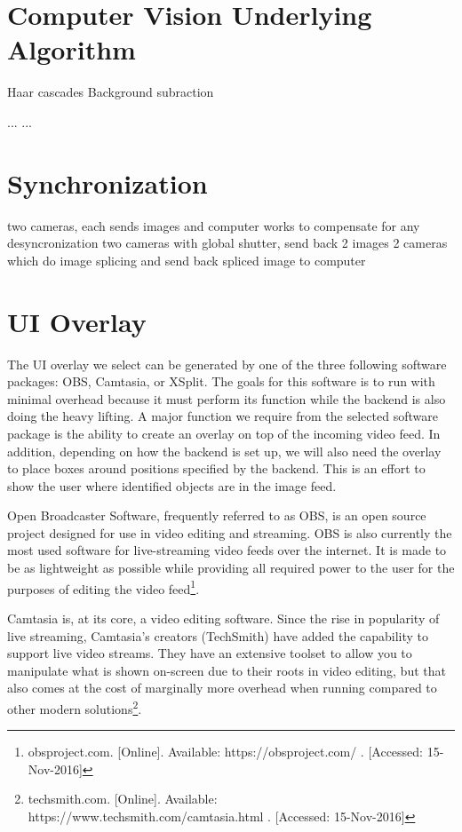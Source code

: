 \documentclass[letterpaper,10pt,onecolumn,draftclsnofoot]{IEEEtran}
\begin{document}
\section{Computer Vision Underlying Algorithm} %

Haar cascades
Background subraction

...
...

\section{Synchronization} %

two cameras, each sends images and computer works to compensate for any desyncronization
two cameras with global shutter, send back 2 images
2 cameras which do image splicing and send back spliced image to computer

\section{UI Overlay} %

The UI overlay we select can be generated by one of the three following software packages:  OBS, Camtasia, or XSplit.  The goals for this software is to run with minimal overhead because it must perform its function while the backend is also doing the heavy lifting.  A major function we require from the selected software package is the ability to create an overlay on top of the incoming video feed.  In addition, depending on how the backend is set up, we will also need the overlay to place boxes around positions specified by the backend.  This is an effort to show the user where identified objects are in the image feed.

Open Broadcaster Software, frequently referred to as OBS, is an open source project designed for use in video editing and streaming.  OBS is also currently the most used software for live-streaming video feeds over the internet.  It is made to be as lightweight as possible while providing all required power to the user for the purposes of editing the video feed\footnote{obsproject.com. [Online]. Available: https://obsproject.com/ . [Accessed: 15-Nov-2016] }.

Camtasia is, at its core, a video editing software.  Since the rise in popularity of live streaming, Camtasia's creators (TechSmith) have added the capability to support live video streams.  They have an extensive toolset to allow you to manipulate what is shown on-screen due to their roots in video editing, but that also comes at the cost of marginally more overhead when running compared to other modern solutions\footnote{techsmith.com. [Online]. Available: https://www.techsmith.com/camtasia.html . [Accessed: 15-Nov-2016] }.
\end{document}
